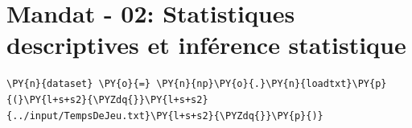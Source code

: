 
    \section{Mandat - 02: Statistiques descriptives et inférence
statistique}\label{mandat---02-statistiques-descriptives-et-infuxe9rence-statistique}

    \begin{tcolorbox}[breakable, size=fbox, boxrule=1pt, pad at break*=1mm,colback=cellbackground, colframe=cellborder]
\begin{Verbatim}[commandchars=\\\{\}]
\PY{n}{dataset} \PY{o}{=} \PY{n}{np}\PY{o}{.}\PY{n}{loadtxt}\PY{p}{(}\PY{l+s+s2}{\PYZdq{}}\PY{l+s+s2}{../input/TempsDeJeu.txt}\PY{l+s+s2}{\PYZdq{}}\PY{p}{)}
\end{Verbatim}
\end{tcolorbox}

